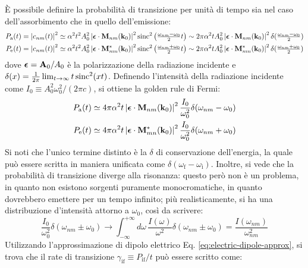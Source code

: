 È possibile definire la probabilità di transizione per unità di tempo sia nel caso dell'assorbimento che in quello dell'emissione:
\begin{align*}
	P_\text{a}(t) &= \left\lvert c_{nm}(t)\right\rvert^2 \simeq \alpha^2 t^2 A_0^2 \left\lvert\boldsymbol{\epsilon} \cdot \mathbf{M}_{nm}(\mathbf{k}_0)\right\rvert^2 \operatorname{sinc}^2 \left( \tfrac{\omega_{nm} - \omega_0}{2} t \right) \sim 2\pi \alpha^2 t A_0^2 \left\lvert\boldsymbol{\epsilon} \cdot \mathbf{M}_{nm}(\mathbf{k}_0)\right\rvert^2 \delta(\tfrac{\omega_{nm} - \omega_0}{2}) \\
	P_\text{e}(t) &= \left\lvert c_{nm}(t)\right\rvert^2 \simeq \alpha^2 t^2 A_0^2 \left\lvert\boldsymbol{\epsilon} \cdot \mathbf{M}_{mn}^*(\mathbf{k}_0)\right\rvert^2 \operatorname{sinc}^2 \left( \tfrac{\omega_{nm} + \omega_0}{2} t \right) \sim 2\pi \alpha^2 t A_0^2 \left\lvert\boldsymbol{\epsilon} \cdot \mathbf{M}_{mn}^*(\mathbf{k}_0)\right\rvert^2 \delta(\tfrac{\omega_{nm} + \omega_0}{2})
\end{align*}
dove $ \boldsymbol{\epsilon} = \mathbf{A}_0 / A_0 $ è la polarizzazione della radiazione incidente e $ \delta(x) = \frac{1}{2\pi} \lim_{t \rightarrow \infty} t \operatorname{sinc}^2(xt) $. Definendo l'intensità della radiazione incidente come $ I_0 \equiv A_0^2 \omega_0^2 / (2\pi c) $, si ottiene la golden rule di Fermi:
\begin{align*}
	P_\text{a}(t) &\simeq 4\pi \alpha^2 t \left\lvert\boldsymbol{\epsilon} \cdot \mathbf{M}_{nm}(\mathbf{k}_0)\right\rvert^2 \frac{I_0}{\omega_0^2} \delta(\omega_{nm} - \omega_0) \\
	P_\text{e}(t) &\simeq 4\pi \alpha^2 t \left\lvert\boldsymbol{\epsilon} \cdot \mathbf{M}_{mn}^*(\mathbf{k}_0)\right\rvert^2 \frac{I_0}{\omega_0^2} \delta(\omega_{nm} + \omega_0)
\end{align*}
Si noti che l'unico termine distinto è la $ \delta $ di conservazione dell'energia, la quale può essere scritta in maniera unificata come $ \delta(\omega_\text{f} - \omega_\text{i}) $. Inoltre, si vede che la probabilità di transizione diverge alla risonanza: questo però non è un problema, in quanto non esistono sorgenti puramente monocromatiche, in quanto dovrebbero emettere per un tempo infinito; più realisticamente, si ha una distribuzione d'intensità attorno a $ \omega_0 $, così da scrivere:
\begin{equation*}
	\frac{I_0}{\omega_0^2} \delta(\omega_{nm} \pm \omega_0) \longrightarrow \int_{-\infty}^{+\infty} d\omega\, \frac{I(\omega)}{\omega^2} \delta(\omega_{nm} \pm \omega_0) = \frac{I(\omega_{nm})}{\omega_{nm}^2}
\end{equation*}
Utilizzando l'approssimazione di dipolo elettrico Eq. \ref{eq:electric-dipole-approx}, si trova che il rate di transizione $ \gamma_\text{if} \equiv P_\text{if} / t $ può essere scritto come:
